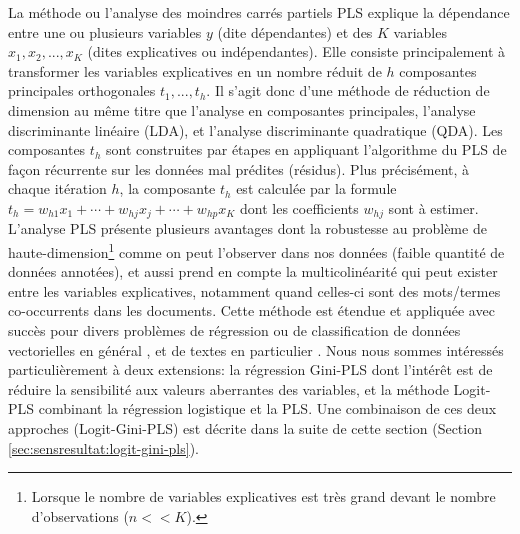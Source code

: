 La méthode ou l'analyse des moindres carrés partiels PLS \citep{wold1966pls} explique la dépendance entre une ou plusieurs variables $y$ (dite dépendantes) et des $K$ variables $x_1,x_2,...,x_K$ (dites explicatives ou indépendantes). Elle consiste principalement à transformer les variables explicatives en un nombre réduit de $h$ composantes principales orthogonales $t_1, ..., t_h$. Il s'agit donc d'une méthode de réduction de dimension au même titre que l'analyse en composantes principales, l'analyse discriminante linéaire (LDA), et l'analyse discriminante quadratique (QDA). Les composantes $t_h$ sont construites par étapes en appliquant l'algorithme du PLS de façon récurrente sur les données mal prédites (résidus). Plus précisément, à chaque itération $h$, la composante $t_h$ est calculée par la formule $t_h = w_{h1} x_1 + \cdots + w_{hj} x_j + \cdots + w_{hp} x_K$ dont les coefficients $w_{hj}$ sont à estimer. L'analyse PLS présente plusieurs avantages \citep{lacroux2011avantagesPLS} dont la robustesse au problème de haute-dimension\footnote{Lorsque le nombre de variables explicatives est très grand devant le nombre d'observations ($n << K$).} comme on peut l'observer dans nos données (faible quantité de données annotées), et aussi prend en compte la multicolinéarité qui peut exister entre les variables explicatives, notamment quand celles-ci sont des mots/termes co-occurrents dans les documents. Cette méthode est étendue et appliquée avec succès pour divers problèmes de régression \citep{lacroux2011avantagesPLS}
 ou de classification de données vectorielles en général \citep{liu2007pls4classif,durif2017sparsePLSandLogit, bazzoli2018classificationwithLS-PLS}, et de textes en particulier \citep{zeng2007textclassPLS}.
Nous nous sommes intéressés particulièrement à deux extensions: la régression Gini-PLS \citep{mussard2018ginipls} dont l'intérêt est de réduire la sensibilité aux valeurs aberrantes des variables, et la méthode Logit-PLS \citep{tenenhaus2005logitpls} combinant la régression logistique et la PLS. Une combinaison de ces deux approches (Logit-Gini-PLS) est décrite dans la suite de cette section (Section \ref{sec:sensresultat:logit-gini-pls}).


